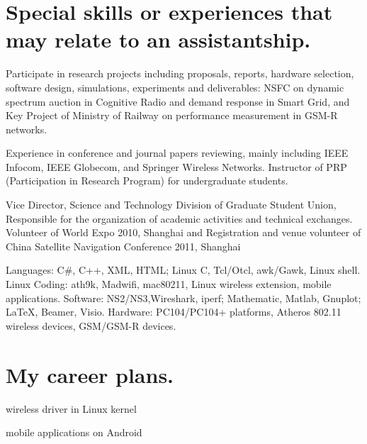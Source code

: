 \documentclass{article}
\begin{document}
\section{Special skills or experiences that may relate to an assistantship.}
Participate in research projects including proposals, reports, hardware selection, software design, simulations, experiments and deliverables: NSFC on dynamic spectrum auction in Cognitive Radio and demand response in Smart Grid, and Key Project of Ministry of Railway on performance measurement in GSM-R networks.

Experience in conference and journal papers reviewing, mainly including IEEE Infocom, IEEE Globecom, and Springer Wireless Networks. Instructor of PRP (Participation in Research Program) for undergraduate students.

Vice Director, Science and Technology Division of Graduate Student Union, Responsible for the organization of academic activities and technical exchanges. Volunteer of World Expo 2010, Shanghai and Registration and venue volunteer of China Satellite Navigation Conference 2011, Shanghai

Languages: C\#, C++, XML, HTML; Linux C, Tcl/Otcl, awk/Gawk, Linux shell. Linux Coding: ath9k, Madwifi, mac80211, Linux wireless extension, mobile applications. Software: NS2/NS3,Wireshark, iperf; Mathematic, Matlab, Gnuplot; \LaTeX, Beamer, Visio. Hardware: PC104/PC104+ platforms, Atheros 802.11 wireless devices, GSM/GSM-R devices.
\section{My career plans.}
wireless driver in Linux kernel

mobile applications on Android
\end{document}
